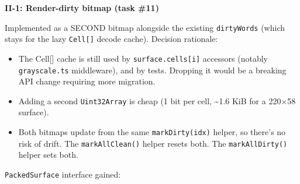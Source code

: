 \textbf{II-1: Render-dirty bitmap (task \#11)}

Implemented as a SECOND bitmap alongside the existing \texttt{d\allowbreak{}i\allowbreak{}r\allowbreak{}t\allowbreak{}y\allowbreak{}W\allowbreak{}o\allowbreak{}r\allowbreak{}d\allowbreak{}s} (which stays for the lazy \texttt{C\allowbreak{}e\allowbreak{}l\allowbreak{}l\allowbreak{}[\allowbreak{}]} decode cache). Decision rationale:

\begin{itemize}
\tightlist
\item
  The Cell{[}{]} cache is still used by \texttt{s\allowbreak{}u\allowbreak{}r\allowbreak{}f\allowbreak{}a\allowbreak{}c\allowbreak{}e\allowbreak{}.\allowbreak{}c\allowbreak{}e\allowbreak{}l\allowbreak{}l\allowbreak{}s\allowbreak{}[\allowbreak{}i\allowbreak{}]} accessors (notably \texttt{g\allowbreak{}r\allowbreak{}a\allowbreak{}y\allowbreak{}s\allowbreak{}c\allowbreak{}a\allowbreak{}l\allowbreak{}e\allowbreak{}.\allowbreak{}t\allowbreak{}s} middleware), and by tests. Dropping it would be a breaking API change requiring more migration.
\item
  Adding a second \texttt{U\allowbreak{}i\allowbreak{}n\allowbreak{}t\allowbreak{}3\allowbreak{}2\allowbreak{}A\allowbreak{}r\allowbreak{}r\allowbreak{}a\allowbreak{}y} is cheap (1 bit per cell, \textasciitilde1.6 KiB for a 220×58 surface).
\item
  Both bitmaps update from the same \texttt{m\allowbreak{}a\allowbreak{}r\allowbreak{}k\allowbreak{}D\allowbreak{}i\allowbreak{}r\allowbreak{}t\allowbreak{}y\allowbreak{}(\allowbreak{}i\allowbreak{}d\allowbreak{}x\allowbreak{})} helper, so there's no risk of drift. The \texttt{m\allowbreak{}a\allowbreak{}r\allowbreak{}k\allowbreak{}A\allowbreak{}l\allowbreak{}l\allowbreak{}C\allowbreak{}l\allowbreak{}e\allowbreak{}a\allowbreak{}n\allowbreak{}(\allowbreak{})} helper resets both. The \texttt{m\allowbreak{}a\allowbreak{}r\allowbreak{}k\allowbreak{}A\allowbreak{}l\allowbreak{}l\allowbreak{}D\allowbreak{}i\allowbreak{}r\allowbreak{}t\allowbreak{}y\allowbreak{}(\allowbreak{})} helper sets both.
\end{itemize}

\texttt{P\allowbreak{}a\allowbreak{}c\allowbreak{}k\allowbreak{}e\allowbreak{}d\allowbreak{}S\allowbreak{}u\allowbreak{}r\allowbreak{}f\allowbreak{}a\allowbreak{}c\allowbreak{}e} interface gained:

